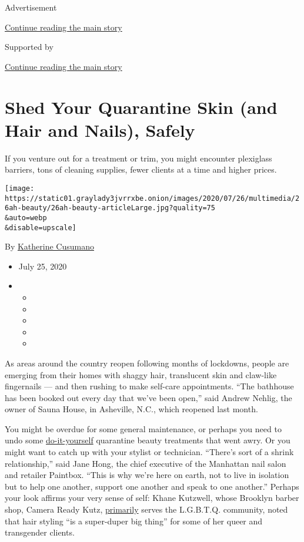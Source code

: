 Advertisement

\protect\hyperlink{after-top}{Continue reading the main story}

Supported by

\protect\hyperlink{after-sponsor}{Continue reading the main story}

\hypertarget{shed-your-quarantine-skin-and-hair-and-nails-safely}{%
\section{Shed Your Quarantine Skin (and Hair and Nails),
Safely}\label{shed-your-quarantine-skin-and-hair-and-nails-safely}}

If you venture out for a treatment or trim, you might encounter
plexiglass barriers, tons of cleaning supplies, fewer clients at a time
and higher prices.

\texttt{[image: https://static01.graylady3jvrrxbe.onion/images/2020/07/26/multimedia/26ah-beauty/26ah-beauty-articleLarge.jpg?quality=75\\\&auto=webp\\\&disable=upscale]}

By
\href{https://www.nytimes3xbfgragh.onion/by/katherine-cusumano}{Katherine
Cusumano}

\begin{itemize}
\item
  July 25, 2020
\item
  \begin{itemize}
  \item
  \item
  \item
  \item
  \item
  \end{itemize}
\end{itemize}

As areas around the country reopen following months of lockdowns, people
are emerging from their homes with shaggy hair, translucent skin and
claw-like fingernails --- and then rushing to make self-care
appointments. ``The bathhouse has been booked out every day that we've
been open,'' said Andrew Nehlig, the owner of Sauna House, in Asheville,
N.C., which reopened last month.

You might be overdue for some general maintenance, or perhaps you need
to undo some
\href{https://www.nytimes3xbfgragh.onion/2020/04/02/t-magazine/home-hair-care-tips-coronavirus.html}{do-it-yourself}
quarantine beauty treatments that went awry. Or you might want to catch
up with your stylist or technician. ``There's sort of a shrink
relationship,'' said Jane Hong, the chief executive of the Manhattan
nail salon and retailer Paintbox. ``This is why we're here on earth, not
to live in isolation but to help one another, support one another and
speak to one another.'' Perhaps your look affirms your very sense of
self: Khane Kutzwell, whose Brooklyn barber shop, Camera Ready Kutz,
\href{https://www.nytimes3xbfgragh.onion/2020/03/11/nyregion/nyc-queer-black-barbershops.html}{primarily}
serves the L.G.B.T.Q. community, noted that hair styling ``is a
super-duper big thing'' for some of her queer and transgender clients.

